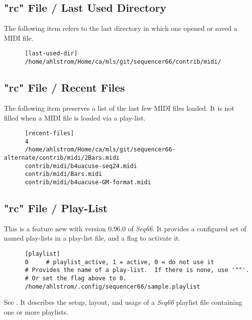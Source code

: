 \subsection{"rc" File / Last Used Directory}
\label{subsec:seq66_rc_file_last_used_dir}

   The following item refers to the last directory in which one opened or
   saved a MIDI file.

   \begin{verbatim}
      [last-used-dir]
      /home/ahlstrom/Home/ca/mls/git/sequencer66/contrib/midi/
   \end{verbatim}

\subsection{"rc" File / Recent Files}
\label{subsec:seq66_rc_file_recent_files}

   The following item preserves a list of the last few MIDI files loaded.
   It is not filled when a MIDI file is loaded via a play-list.

   \begin{verbatim}
      [recent-files]
      4
      /home/ahlstrom/Home/ca/mls/git/sequencer66-alternate/contrib/midi/2Bars.midi
      contrib/midi/b4uacuse-seq24.midi
      contrib/midi/Bars.midi
      contrib/midi/b4uacuse-GM-format.midi
   \end{verbatim}

\subsection{"rc" File / Play-List}
\label{subsec:seq66_rc_file_playlist}

   This is a feature new with version 0.96.0 of \textsl{Seq66}.
   It provides a configured set of named play-lists in a play-list file,
   and a flag to activate it.
   
   \index{[playlist]}
   \begin{verbatim}
      [playlist]
      0     # playlist_active, 1 = active, 0 = do not use it
      # Provides the name of a play-list.  If there is none, use '""'.
      # Or set the flag above to 0.
      /home/ahlstrom/.config/sequencer66/sample.playlist
   \end{verbatim}

   See .
   It describes the setup, layout, and usage of a
   \textsl{Seq66} playlist file containing one or more playlists.

